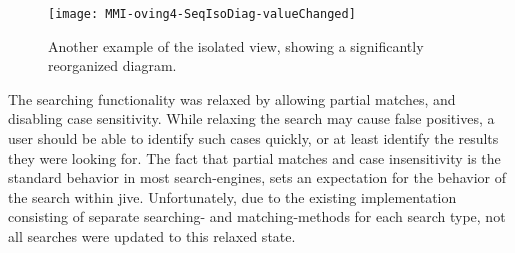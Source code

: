 \begin{figure}[H]
	\centering
	\texttt{[image: MMI-oving4-SeqIsoDiag-valueChanged]}
	\caption{Another example of the isolated view, showing a significantly reorganized diagram.}
	\label{fig:MMI-oving4-SeqIsoDiag-valueChanged}
\end{figure}

The searching functionality was relaxed by allowing partial matches, and disabling case sensitivity.
While relaxing the search may cause false positives, a user should be able to identify such cases quickly, or at least identify the results they were looking for.
The fact that partial matches and case insensitivity is the standard behavior in most search-engines, sets an expectation for the behavior of the search within \gls{jive}.
Unfortunately, due to the existing implementation consisting of separate searching- and matching-methods for each search type, not all searches were updated to this relaxed state.

